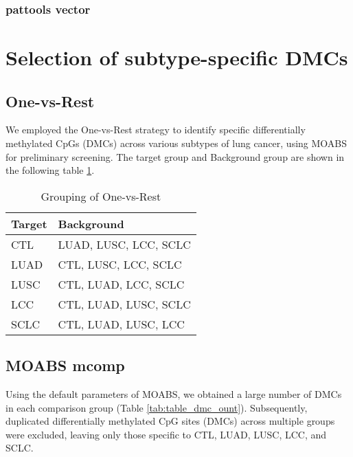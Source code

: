 \documentclass[12pt,letterpaper]{article}
\begin{document}
\subsubsection{pattools vector}

\section{Selection of subtype-specific DMCs}\label{sec:selection-of-dmcs}

\subsection{One-vs-Rest}

We employed the One-vs-Rest strategy to identify specific differentially methylated CpGs (DMCs) across various
subtypes of lung cancer, using MOABS\cite{sun_moabs_2014} for preliminary screening. The target group and Background
group are shown in the following table \ref*{tab:grouping}.

\begin{table}[!h]
    \begin{center}
        \caption{ Grouping of One-vs-Rest }
        \begin{tabular}{|l|l|}
            \hline
            Target & Background            \\
            \hline
            CTL    & LUAD, LUSC, LCC, SCLC \\
            LUAD   & CTL, LUSC, LCC, SCLC  \\
            LUSC   & CTL, LUAD, LCC, SCLC  \\
            LCC    & CTL, LUAD, LUSC, SCLC \\
            SCLC   & CTL, LUAD, LUSC, LCC  \\
            \hline
        \end{tabular}
    \end{center}
    \label{tab:grouping}
\end{table}

\subsection{MOABS mcomp}

Using the default parameters of MOABS, we obtained a large number of DMCs in each comparison group (Table \ref{tab:table_dmc_ount}).
Subsequently, duplicated differentially methylated CpG sites (DMCs) across multiple groups were excluded, leaving
only those specific to CTL, LUAD, LUSC, LCC, and SCLC.
\end{document}

